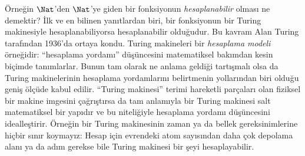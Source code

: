 \documentclass[../../../include/open-logic-section]{subfiles}
\begin{document}

Örneğin $\Nat$'den $\Nat$'ye giden bir fonksiyonun
\emph{hesaplanabilir} olması ne demektir? İlk ve en bilinen yanıtlardan biri,
bir fonksiyonun bir Turing makinesiyle hesaplanabiliyorsa hesaplanabilir
olduğudur. Bu kavram Alan Turing tarafından 1936'da ortaya kondu. Turing
makineleri bir \emph{hesaplama modeli} örneğidir: ``hesaplama yordamı''
düşüncesini matematiksel bakımdan kesin biçimde tanımlarlar. Bunun tam olarak
ne anlama geldiği tartışmalı olsa da Turing makinelerinin hesaplama
yordamlarını belirtmenin yollarından biri olduğu geniş ölçüde kabul edilir.
``Turing makinesi'' terimi hareketli parçaları olan fiziksel bir makine
imgesini çağrıştırsa da tam anlamıyla bir Turing makinesi salt matematiksel
bir yapıdır ve bu niteliğiyle hesaplama yordamı düşüncesini idealleştirir.
Örneğin bir Turing makinesinin zaman ya da bellek gereksinimlerine hiçbir
sınır koymayız: Hesap için evrendeki atom sayısından daha çok depolama alanı
ya da adım gerekse bile Turing makinesi bir şeyi hesaplayabilir.
\end{document}
